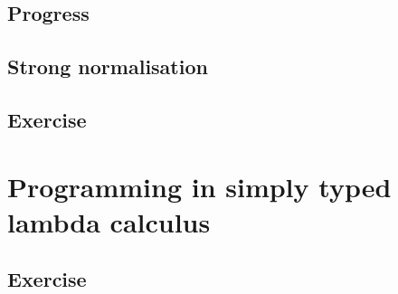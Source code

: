 \subsection{Progress}
\subsection{Strong normalisation}
\subsection*{Exercise}
\section{Programming in simply typed lambda calculus}
\subsection*{Exercise}


 

